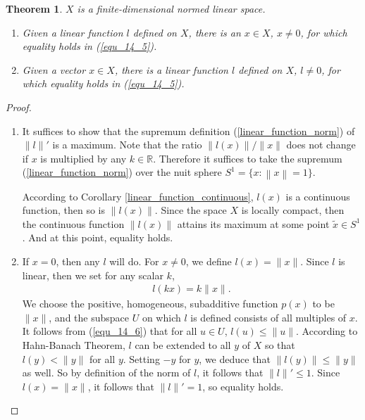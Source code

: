 \documentclass[10pt]{book}
\newtheorem{theorem}{Theorem}[chapter]
\theoremstyle{definition}
\numberwithin{equation}{chapter}
\begin{document}
\medskip

\begin{theorem}\label{equality_hold_theorem}
$X$ is a finite-dimensional normed linear space.
\begin{enumerate}[label=(\alph*)]
    \item Given a linear function $l$ defined on $X$, there is an $x \in X$, $x \neq 0$, for which equality holds in (\ref{equ_14_5}).
    
    \item Given a vector $x \in X$, there is a linear function $l$ defined on $X$, $l \neq 0$, for which equality holds in (\ref{equ_14_5}).
\end{enumerate}
\end{theorem}
\begin{proof}
~\begin{enumerate}[label=(\alph*)]
    \item It suffices to show that the supremum definition (\ref{linear_function_norm}) of $\|l\|'$ is a maximum. Note that the ratio $\|l(x)\|/\|x\|$ does not change if $x$ is multiplied by any $k \in \mathbb{R}$. Therefore it suffices to take the supremum (\ref{linear_function_norm}) over the nuit sphere $S^1 = \{x: \left\|x\right\| = 1\}$.
    
    According to Corollary \ref{linear_function_continuous}, $l(x)$ is a continuous function, then so is $\|l(x)\|$. Since the space $X$ is locally compact, then the continuous function $\|l(x)\|$ attains its maximum at some point $\widetilde{x} \in S^1$. And at this point, equality holds.
    
    \item If $x = 0$, then any $l$ will do. For $x \neq 0$, we define $l(x) = \|x\|$. Since $l$ is linear, then we set for any scalar $k$, 
    \begin{align}\label{equ_14_6}
        l(kx) = k \|x\|.
    \end{align}
    We choose the positive, homogeneous, subadditive function $p(x)$ to be $\|x\|$, and the subspace $U$ on which $l$ is defined consists of all multiples of $x$. It follows from (\ref{equ_14_6}) that for all $u \in U$, $l(u) \leq \|u\|$. According to Hahn-Banach Theorem, $l$ can be extended to all $y$ of $X$ so that $l(y) < \|y\|$ for all $y$.  Setting $-y$ for $y$, we deduce that $\left\|l(y)\right\| \leq \|y\|$ as well. So by definition of the norm of $l$, it follows that $\|l\|' \leq 1$. Since $l(x) = \|x\|$, it follows that $\|l\|' = 1$, so equality holds.
\end{enumerate}
\end{proof}
\end{document}
